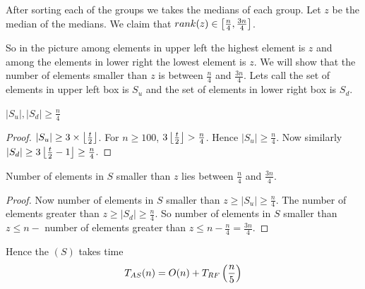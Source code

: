 After sorting each of the groups we takes the medians of each group. Let $z$ be the median of the medians. We claim that $rank(z)\in  \left[\frac{n}{4},\frac{3n}{4}\right]$. 

\begin{algorithm}
	\DontPrintSemicolon
\caption{$(S)$}
\end{algorithm}

So in the picture among elements in upper left the highest element is $z$ and among the elements in lower right the lowest element is $z$. We will show that the number of elements smaller than $z$ is between $\frac{n}{4} $ and $\frac{3n}{4}$. Lets call the set of elements in upper left box is $S_u$ and the set of elements in lower right box is $S_d$.

\begin{lemma}{}{}
	$|S_u|,|S_d|\geq\frac{n}{4}$
\end{lemma}
\begin{proof}
	$|S_u|\geq 3\times \left\lfloor\frac{t}{2}\right\rfloor$. For $n\geq 100$, $3\left\lfloor\frac{t}{2}\right\rfloor> \frac{n}{4}$. Hence $|S_u|\geq \frac{n}{4}$. Now similarly $|S_d|\geq 3\left\lfloor\frac{t}{2}-1\right\rfloor\geq \frac{n}{4}$.
\end{proof}
\begin{lemma}{}{}
	Number of elements in $S$ smaller than $z$ lies between $\frac{n}4$ and $\frac{3n}{4}$.
\end{lemma}
\begin{proof}
	Now number of elements in $S$ smaller than $z\geq |S_u|\geq \frac{n}4$. The number of elements greater than $z\geq |S_d|\geq \frac{n}{4}$. So number of elements in $S$ smaller than $z\leq n-$ number of elements greater than $z\leq n-\frac{n}4=\frac{3n}{4}$.
\end{proof}
Hence the $(S)$ takes time $$T_{AS}(n)=O(n)+T_{RF}\left(\frac{n}{5}\right)$$
